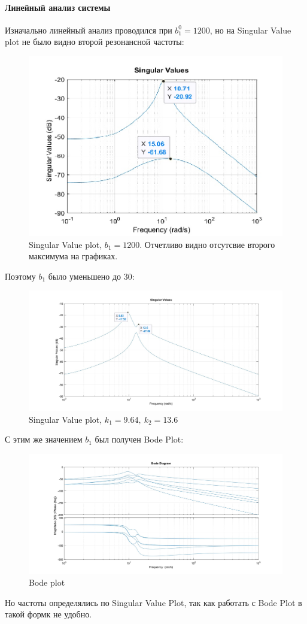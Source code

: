 \documentclass{article}
\begin{document}
	\paragraph*{Линейный анализ системы}
	Изначально линейный анализ проводился при $b^0_1=1200$, но на Singular Value plot не было видно второй резонансной частоты:
	\begin{figure}[H]
		\centering
		\includegraphics[width=0.7\linewidth]{sv1200}
		\caption{Singular Value plot, $b_1 = 1200$. Отчетливо видно отсутсвие второго максимума на графиках.}
		\label{fig:sv1200}
	\end{figure}
	Поэтому $b_1$ было уменьшено до 30:
	\begin{figure}[H]
		\centering
		\includegraphics[width=0.7\linewidth]{sv30}
		\caption{Singular Value plot, $k_1 = 9.64,\ k_2 = 13.6$}
		\label{fig:sv30}
	\end{figure}
	С этим же значением $b_1$ был получен Bode Plot:
	\begin{figure}[H]
		\centering
		\includegraphics[width=0.7\linewidth]{bode30}
		\caption{Bode plot}
		\label{fig:bode30}
	\end{figure}
	Но частоты определялись по Singular Value Plot, так как работать с Bode Plot в такой формк не удобно.
\end{document}
